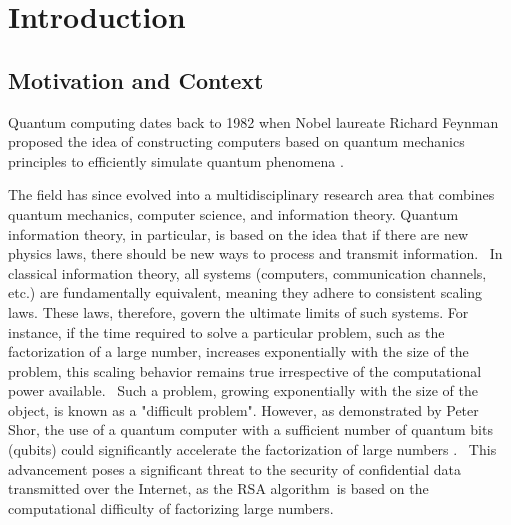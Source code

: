 \chapter{Introduction}


\section{Motivation and Context}


Quantum computing dates back to 1982 when Nobel laureate Richard Feynman proposed the idea of constructing computers based on quantum mechanics principles to efficiently simulate quantum phenomena \cite{feynman2018simulating}. 

The field has since evolved into a multidisciplinary research area that combines quantum mechanics, computer science, and information theory. Quantum information theory, in particular, is based on the idea that if there are new physics laws, there should be new ways to process and transmit information.  In classical information theory, all systems (computers, communication channels, etc.) are fundamentally equivalent, meaning they adhere to consistent scaling laws. These laws, therefore, govern the ultimate limits of such systems. For instance, if the time required to solve a particular problem, such as the factorization of a large number, increases exponentially with the size of the problem, this scaling behavior remains true irrespective of the computational power available.  Such a problem, growing exponentially with the size of the object, is known as a "difficult problem". However, as demonstrated by Peter Shor, the use of a quantum computer with a sufficient number of quantum bits (qubits) could significantly accelerate the factorization of large numbers \cite{shor1994algorithms}.  This advancement poses a significant threat to the security of confidential data transmitted over the Internet, as the RSA algorithm is based on the computational difficulty of factorizing large numbers.

